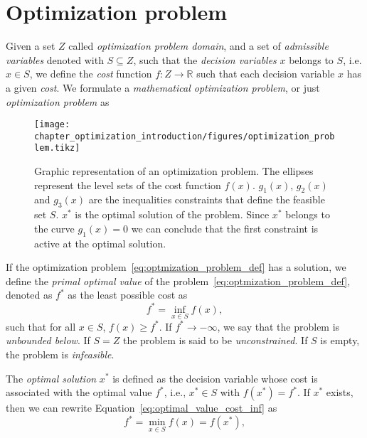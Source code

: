 \section{Optimization problem\label{sec:optionization_problem}}
Given a set $Z$ called \emph{optimization problem domain}, and a set of \emph{admissible variables} denoted with $S\subseteq Z$, such that the \emph{decision variables} $x$ belongs to $S$, i.e. $x\in S$, we define the \emph{cost} function $f:Z \rightarrow \mathbb{R}$  such that each decision variable $x$ has a given \emph{cost}.
We formulate a \emph{mathematical optimization problem}, or just \emph{optimization problem} as
\begin{figure}[t]
\centering
    \texttt{[image: chapter\_optimization\_introduction/figures/optimization\_problem.tikz]}
	\caption[Graphic representation of an optimization problem]{Graphic representation of an optimization problem. The ellipses represent the level sets of the cost function $f(x)$. $g_1(x)$, $g_2(x)$ and $g_3(x)$ are the inequalities constraints that define the feasible set $S$. $x^*$ is the optimal solution of the problem. Since $x^*$ belongs to the curve $g_1(x) = 0$ we can conclude that the  first constraint is active at the optimal solution.}
	\label{fig:optimization_problem}
\end{figure}
If the optimization problem~\eqref{eq:optmization_problem_def} has a solution, we define the \emph{primal optimal value} of the problem~\eqref{eq:optmization_problem_def}, denoted as $f^*$ as the least possible cost as
\begin{equation}
\label{eq:optimal_value_cost_inf}
    f^* = \inf\limits_{x\in S} f(x),
\end{equation} 
such that for all $x \in S$,  $f(x) \ge f^*$.
If $f^* \rightarrow -\infty$, we say that the problem is \emph{unbounded below}. If $S=Z$ the problem is said to be \emph{unconstrained}. If $S$ is empty, the problem is \emph{infeasible}.
\par
The \emph{optimal solution} $x^*$ is defined as the decision variable whose cost is associated with the optimal value $f^*$, i.e., $x^* \in S$ with $f(x^*) = f^*$. If $x^*$ exists, then we can rewrite Equation~\eqref{eq:optimal_value_cost_inf} as
\begin{equation}
        f^* = \min\limits_{x\in S} f(x) = f(x^*),
\end{equation}
